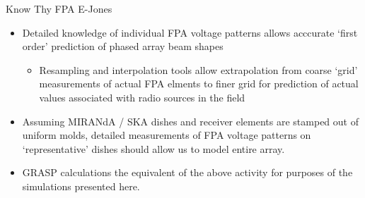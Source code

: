 \documentclass[pdf,azure,slideColor,colorBG]{prosper}
\begin{document}
\begin{slide}{Know Thy FPA E-Jones}
\begin{small}
\begin{itemize}
\item Detailed knowledge of individual FPA voltage patterns allows
acccurate `first order' prediction of phased array beam shapes
\begin{itemize}
\item Resampling and interpolation tools allow extrapolation from 
coarse `grid' measurements of actual FPA elments to finer grid for 
prediction of actual values associated with radio sources in the field
\end{itemize}
\item Assuming MIRANdA / SKA dishes and receiver elements are stamped out of 
uniform molds, detailed measurements of FPA voltage patterns on 
`representative' dishes should allow us to model entire array.
\item GRASP calculations the equivalent of the above activity for
purposes of the simulations presented here.
\end{itemize}
\end {small}
\end{slide}
\end{document}
